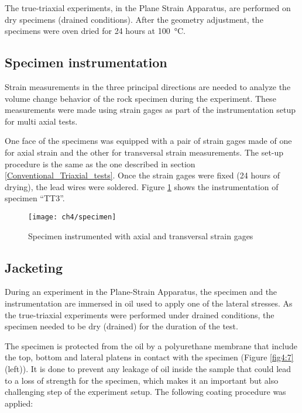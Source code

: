 The true-triaxial experiments, in the Plane Strain Apparatus, are performed on dry specimens (drained conditions). After the geometry adjustment, the specimens were oven dried for 24 hours at \SI{100}{\celsius}.

\subsection{Specimen instrumentation}

Strain measurements in the three principal directions are needed to analyze the volume change behavior of the rock specimen during the experiment. These measurements were made using strain gages as part of the instrumentation setup for multi axial tests. 

One face of the specimens was equipped with a pair of strain gages made of one for axial strain and the other for transversal strain measurements. The set-up procedure is the same as the one described in section \ref{Conventional_Triaxial_tests}. Once the strain gages were fixed (24 hours of drying), the lead wires were soldered. Figure \ref{fig4:6} shows the instrumentation of specimen “TT3”.  

\begin{figure}[tb]
    \centering
    \texttt{[image: ch4/specimen]}
    \captionsetup{justification=centering}
    \caption{Specimen instrumented with axial and transversal strain gages}
    \label{fig4:6}
\end{figure} 

\subsection{Jacketing}

During an experiment in the Plane-Strain Apparatus, the specimen and the instrumentation are immersed in oil used to apply one of the lateral stresses. As the true-triaxial experiments were performed under drained conditions, the specimen needed to be dry (drained) for the duration of the test. 

The specimen is protected from the oil by a polyurethane membrane that include the top, bottom and lateral platens in contact with the specimen (Figure \ref{fig4:7} (left)). It is done to prevent any leakage of oil inside the sample that could lead to a loss of strength for the specimen, which makes it an important but also challenging step of the experiment setup. The following coating procedure was applied: 

